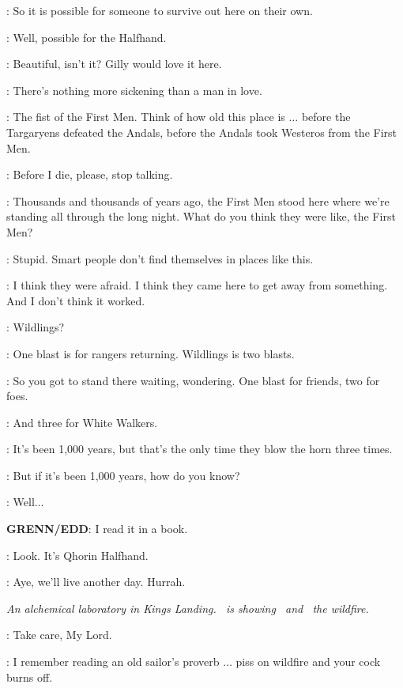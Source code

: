 \JON: So it is possible for someone to survive out here on their own. 

\JEOR: Well, possible for the Halfhand. 

\SAM: Beautiful, isn't it? Gilly would love it here. 

\EDD: There's nothing more sickening than a man in love. 


\SAM: The fist of the First Men. Think of how old this place is $\ldots$ before the Targaryens defeated the Andals, before the Andals took Westeros from the First Men. 

\EDD: Before I die, please, stop talking. 

\SAM: Thousands and thousands of years ago, the First Men stood here where we're standing all through the long night. What do you think they were like, the First Men? 

\EDD: Stupid. Smart people don't find themselves in places like this. 

\JON: I think they were afraid. I think they came here to get away from something. And I don't think it worked. 


\GRENN: Wildlings? 

\JON: One blast is for rangers returning. Wildlings is two blasts. 

\EDD: So you got to stand there waiting, wondering. One blast for friends, two for foes. 

\SAM: And three for White Walkers. 


\SAM: It's been 1,000 years, but that's the only time they blow the horn three times. 

\GRENN: But if it's been 1,000 years, how do you know? 

\SAM: Well$\ldots$ 

\textbf{GRENN/EDD}: I read it in a book. 

\JON: Look. It's Qhorin Halfhand. 

\EDD: Aye, we'll live another day. Hurrah. 



\scene

\textit{An alchemical laboratory in Kings Landing. \HALLYN ~is showing \TYRION ~and \BRONN ~the wildfire.} 

\HALLYN: Take care, My Lord. 

\TYRION: I remember reading an old sailor's proverb $\ldots$ piss on wildfire and your cock burns off. 

